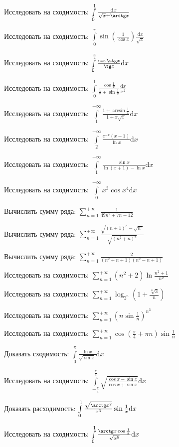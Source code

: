 \documentclass[russian]{article}
\newcommand{\dx}{\text{d}x}
\begin{document}

Исследовать на сходимость:
$\int\limits_0^1 \frac{\dx}{\sqrt{x} + \arctg x}$

Исследовать на сходимость:
$\int\limits_0^\pi \sin\left(\frac{1}{\cos x}\right) \frac{\dx}{\sqrt{x}}$

Исследовать на сходимость:
$\int\limits_0^{\frac{\pi}{4}} \frac{\cos \ctg x}{\tg x} \dx$

Исследовать на сходимость:
$\int\limits_0^1 \frac{\cos \frac{1}{x}}{\frac{1}{x} + \sin \frac{1}{x}} \frac{\dx}{x^2}$


Исследовать на сходимость:
$\int\limits_1^{+\infty} \frac{1 + \arcsin \frac{1}{x}}{1 + x \sqrt{x}} \dx$

Исследовать на сходимость:
$\int\limits_2^{+\infty} \frac{e^{-x} (x - 1)}{\ln x} \dx$

Исследовать на сходимость:
$\int\limits_1^{+\infty} \frac{\sin x}{\ln(x + 1) - \ln x} \dx$

Исследовать на сходимость:
$\int\limits_0^{+\infty} x^3 \cos x^4 \dx$


Вычислить сумму ряда:
$\sum\limits_{n = 1}^{+\infty} \frac{1}{49n^2 + 7n - 12}$

Вычислить сумму ряда:
$\sum\limits_{n = 1}^{+\infty}  \frac{\sqrt{(n + 1)^e} - \sqrt{n^e}}{\sqrt{(n^2 + n)^e}}$

Вычислить сумму ряда:
$\sum\limits_{n = 1}^{+\infty}  \frac{2}{(n^2 + n + 1)(n^2 - n + 1)}$


Исследовать на сходимость:
$\sum\limits_{n = 1}^{+\infty} (n^2 + 2) \ln\frac{n^2 + 1}{n^2}$

Исследовать на сходимость:
$\sum\limits_{n = 1}^{+\infty} \log_{2^n} \left(1 + \frac{\sqrt[n]{3}}{n}\right)$

Исследовать на сходимость:
$\sum\limits_{n = 1}^{+\infty} \left(n\sin \frac{1}{n}\right)^{n^3}$

Исследовать на сходимость:
$\sum\limits_{n = 1}^{+\infty} \cos \left(\frac{\pi}{4} + \pi n \right) \sin \frac{1}{n}$


Доказать сходимость:
$\int\limits_0^\pi \frac{\ln x}{\sqrt{\sin x}} \dx$

Исследовать на сходимость:
$\int\limits_{-\frac{\pi}{4}}^\frac{\pi}{4} \sqrt{\frac{\cos x - \sin x}{\cos x + \sin x}} \dx$

Доказать расходимость:
$\int\limits_0^1 \frac{\sqrt{\arctg x^2}}{x^3} \sin \frac{1}{x} \dx$

Исследовать на сходимость:
$\int\limits_0^1 \frac{\arctg x \cos \frac{1}{x}}{\sqrt{x^5}} \dx$
\end{document}
